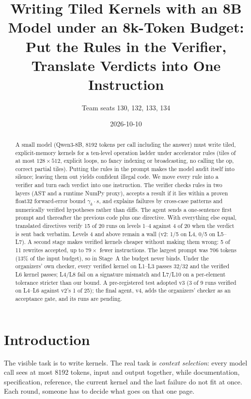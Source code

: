 \documentclass[11pt]{article}
\title{Writing Tiled Kernels with an 8B Model under an 8k-Token Budget:\\[2pt]
\large Put the Rules in the Verifier, Translate Verdicts into One Instruction}
\author{Team seats 130, 132, 133, 134}
\date{2026-10-10}
\begin{document}
\maketitle

\begin{abstract}
\noindent
A small model (Qwen3-8B, 8192 tokens per call including the answer) must write tiled,
explicit-memory kernels for a ten-level operation ladder under accelerator rules (tiles of at most
$128\times512$, explicit loops, no fancy indexing or broadcasting, no calling the op, correct partial
tiles). Putting the rules in the prompt makes the model audit itself into silence; leaving them out
yields confident illegal code. We move every rule into a verifier and turn each verdict into one
instruction. The verifier checks rules in two layers (AST and a runtime NumPy proxy), accepts a
result if it lies within a proven float32 forward-error bound $\gamma_k\cdot s$, and explains failures by
cross-case patterns and numerically verified hypotheses rather than diffs. The agent sends a
one-sentence first prompt and thereafter the previous code plus one directive. With everything
else equal, translated directives verify 15 of 20 runs on levels 1--4 against 4 of 20 when the
verdict is sent back verbatim. Levels 4 and above remain a wall (v2: 1/5 on L4, 0/5 on L5--L7).
A second stage makes verified kernels cheaper without making them wrong: 5 of 11 rewrites accepted,
up to $79\times$ fewer instructions. The largest prompt was 706 tokens (13\% of the input budget), so
in Stage~A the budget never binds. Under the organizers' own checker, every verified kernel on L1--L3
passes 32/32 and the verified L6 kernel passes; L4/L8 fail on a signature mismatch and L7/L10 on a
per-element tolerance stricter than our bound. A pre-registered test adopted v3 (3 of 9 runs verified on
L4--L6 against v2's 1 of 25); the final agent, v4, adds the organizers' checker as an acceptance gate,
and its runs are pending.
\end{abstract}

\tableofcontents

\section{Introduction}

The visible task is to write kernels. The real task is \emph{context selection}: every model call
sees at most 8192 tokens, input and output together, while documentation, specification, reference,
the current kernel and the last failure do not fit at once. Each round, someone has to decide what
goes on that one page.
\end{document}
